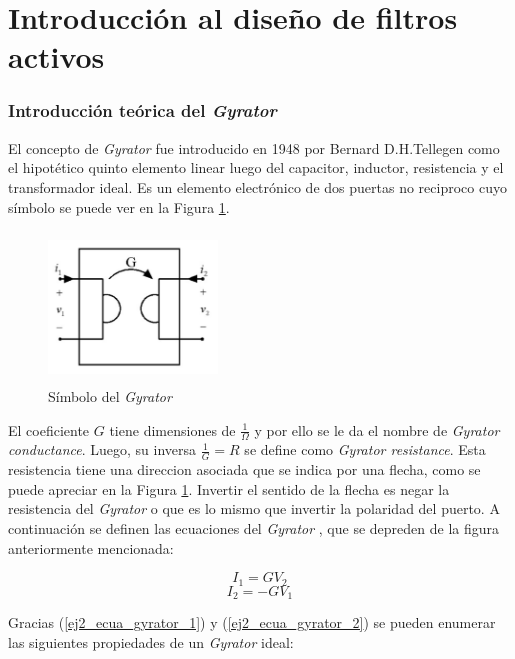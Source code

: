 \documentclass[12pt,a4paper]{article}
\begin{document}
\part{Introducción al diseño de filtros activos}
\section{Introducción teórica del \textit{Gyrator}}
El concepto de \textit{Gyrator} fue introducido en 1948 por Bernard D.H.Tellegen como el hipotético quinto elemento linear luego del capacitor, inductor, resistencia y
el transformador ideal. Es un elemento electrónico de dos puertas no reciproco cuyo símbolo se puede ver en la Figura \ref{ej2_gyrator_symbol}.

\begin{figure}[h!]                                                       
    \centering\includegraphics[width=0.4\textwidth, height=4cm]{Resources/ej2_gyrator_symbol.png}
    \caption{Símbolo del \textit{Gyrator}}
    \label{ej2_gyrator_symbol}
    \end{figure}

El coeficiente $G$ tiene dimensiones de $\frac{1}{\Omega}$ y por ello se le da el nombre de \textit{Gyrator conductance}. Luego, su inversa $\frac{1}{G} = R$ se define como \textit{Gyrator resistance}. Esta resistencia tiene una direccion asociada que 
se indica por una flecha, como se puede apreciar en la Figura \ref{ej2_gyrator_symbol}. Invertir el sentido de la flecha es negar la resistencia del \textit{Gyrator} o que es lo mismo que invertir
la polaridad del puerto. A continuación se definen las ecuaciones del \textit{Gyrator} , que se depreden de la figura anteriormente mencionada:

\begin{equation} I_{1} = G V_2 \label{ej2_ecua_gyrator_1}\end{equation}
\begin{equation} I_{2} =  -G V_1 \label{ej2_ecua_gyrator_2}\end{equation}


Gracias (\ref{ej2_ecua_gyrator_1}) y (\ref{ej2_ecua_gyrator_2}) se pueden enumerar las siguientes propiedades de un \textit{Gyrator} ideal:    
\end{document}
